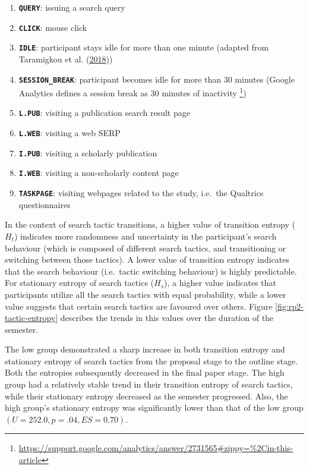 \documentclass[letterpaper, nobind]{templates/ociamthesis}
\providecommand{\tightlist}{%
  \setlength{\itemsep}{0pt}\setlength{\parskip}{0pt}}
\begin{document}
\begin{enumerate}
\def\labelenumi{\arabic{enumi}.}
\tightlist
\item
  \textbf{\texttt{QUERY}}: issuing a search query
\item
  \textbf{\texttt{CLICK}}: mouse click
\item
  \textbf{\texttt{IDLE}}: participant stays idle for more than one minute (adapted from Taramigkou et al. (\protect\hyperlink{ref-taramigkou2018leveraging}{2018}))
\item
  \textbf{\texttt{SESSION\_BREAK}}: participant becomes idle for more than 30 minutes (Google Analytics defines a session break as 30 minutes of inactivity \footnote{\url{https://support.google.com/analytics/answer/2731565\#zippy=\%2Cin-this-article}})
\item
  \textbf{\texttt{L.PUB}}: visiting a publication search result page
\item
  \textbf{\texttt{L.WEB}}: visiting a web SERP
\item
  \textbf{\texttt{I.PUB}}: visiting a scholarly publication
\item
  \textbf{\texttt{I.WEB}}: visiting a non-scholarly content page
\item
  \textbf{\texttt{TASKPAGE}}: visiting webpages related to the study, i.e.~the Qualtrics questionnaires
\end{enumerate}

In the context of search tactic transitions, a higher value of transition entropy (\(H_t\)) indicates more randomness and uncertainty in the participant's search behaviour (which is composed of different search tactics, and transitioning or switching between those tactics).
A lower value of transition entropy indicates that the search behaviour (i.e.~tactic switching behaviour) is highly predictable.
For stationary entropy of search tactics (\(H_s\)), a higher value indicates that participants utilize all the search tactics with equal probability, while a lower value suggests that certain search tactics are favoured over others.
Figure \ref{fig:rp2-tactic-entropy} describes the trends in this values over the duration of the semester.

The low group demonstrated a sharp increase in both transition entropy and stationary entropy of search tactics from the proposal stage to the outline stage.
Both the entropies subsequently decreased in the final paper stage.
The high group had a relatively stable trend in their transition entropy of search tactics, while their stationary entropy decreased as the semester progressed.
Also, the high group's stationary entropy was significantly lower than that of the low group \((U = 252.0, p = .04, ES = 0.70)\).
\end{document}
